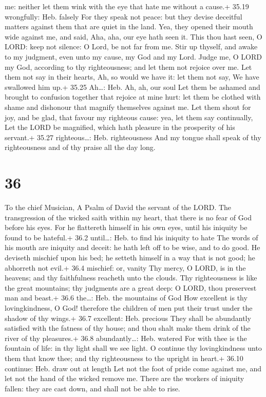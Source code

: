 me: neither let them wink with the eye that hate me without a cause.+
35.19 wrongfully: Heb. falsely  For they speak not peace:
but they devise deceitful matters against them that are quiet in the
land.  Yea, they opened their mouth wide against me, and
said, Aha, aha, our eye hath seen it.  This thou hast seen,
O LORD: keep not silence: O Lord, be not far from me.  Stir
up thyself, and awake to my judgment, even unto my cause, my God and my
Lord.  Judge me, O LORD my God, according to thy
righteousness; and let them not rejoice over me.  Let them
not say in their hearts, Ah, so would we have it: let them not say, We
have swallowed him up.+ 35.25 Ah\ldots: Heb. Ah, ah, our soul
 Let them be ashamed and brought to confusion together that
rejoice at mine hurt: let them be clothed with shame and dishonour that
magnify themselves against me.  Let them shout for joy, and
be glad, that favour my righteous cause: yea, let them say continually,
Let the LORD be magnified, which hath pleasure in the prosperity of his
servant.+ 35.27 righteous\ldots: Heb. righteousness  And my
tongue shall speak of thy righteousness and of thy praise all the day
long.

\hypertarget{section-35}{%
\section{36}\label{section-35}}

To the chief Musician, A Psalm of David the servant of the LORD.
 The transgression of the wicked saith within my heart, that
there is no fear of God before his eyes.  For he flattereth
himself in his own eyes, until his iniquity be found to be hateful.+
36.2 until\ldots: Heb. to find his iniquity to hate  The
words of his mouth are iniquity and deceit: he hath left off to be wise,
and to do good.  He deviseth mischief upon his bed; he
setteth himself in a way that is not good; he abhorreth not evil.+ 36.4
mischief: or, vanity  Thy mercy, O LORD, is in the heavens;
and thy faithfulness reacheth unto the clouds.  Thy
righteousness is like the great mountains; thy judgments are a great
deep: O LORD, thou preservest man and beast.+ 36.6 the\ldots: Heb. the
mountains of God  How excellent is thy lovingkindness, O
God! therefore the children of men put their trust under the shadow of
thy wings.+ 36.7 excellent: Heb. precious  They shall be
abundantly satisfied with the fatness of thy house; and thou shalt make
them drink of the river of thy pleasures.+ 36.8 abundantly\ldots: Heb.
watered  For with thee is the fountain of life: in thy light
shall we see light.  O continue thy lovingkindness unto
them that know thee; and thy righteousness to the upright in heart.+
36.10 continue: Heb. draw out at length  Let not the foot
of pride come against me, and let not the hand of the wicked remove me.
 There are the workers of iniquity fallen: they are cast
down, and shall not be able to rise.

